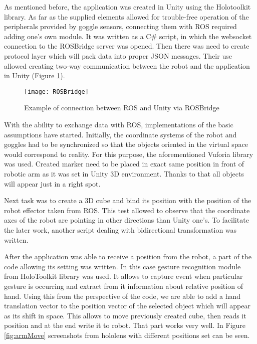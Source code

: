 \documentclass[printmode,en]{mgr}
\begin{document}
As mentioned before, the application was created in Unity using the Holotoolkit library. As far as the supplied elements allowed for trouble-free operation of the peripherals provided by goggle sensors, connecting them with ROS required adding one's own module. It was written as a C\# script, in which the websocket connection to the ROSBridge server was opened. Then there was need to create protocol layer which will pack data into proper JSON messages. Their use allowed creating two-way communication between the robot and the application in Unity (Figure \ref{fig:ROSBridge}).

\begin{figure}[!ht]
  \centering
    \texttt{[image: ROSBridge]}
  \caption{Example of connection between ROS and Unity via ROSBridge}
  \label{fig:ROSBridge}
\end{figure}

With the ability to exchange data with ROS, implementations of the basic assumptions have started. Initially, the coordinate systems of the robot and goggles had to be synchronized so that the objects oriented in the virtual space would correspond to reality. For this purpose, the aforementioned Vuforia library was used. Created marker need to be placed in exact same position in front of robotic arm as it was set in Unity 3D environment. Thanks to that all objects will appear just in a right spot.

Next task was to create a 3D cube and bind its position with the position of the robot effector taken from ROS. This test allowed to observe that the coordinate axes of the robot are pointing in other directions than Unity one's. To facilitate the later work, another script dealing with bidirectional transformation was written.

After the application was able to receive a position from the robot, a part of the code allowing its setting was written. In this case gesture recognition module from HoloToolkit library was used. It allows to capture event when particular gesture is occurring and extract from it information about relative position of hand. Using this from the perspective of the code, we are able to add a hand translation vector to the position vector of the selected object which will appear as its shift in space. This allows to move previously created cube, then reads it position and at the end write it to robot. That part works very well. In Figure \ref{fig:armMove} screenshots from hololens with different positions set can be seen.
\end{document}
